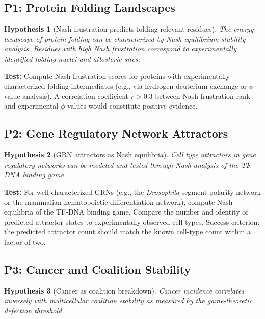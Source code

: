 \documentclass[12pt,a4paper]{article}
\newtheorem{hypothesis}{Hypothesis}
\theoremstyle{remark}
\begin{document}
\subsection{P1: Protein Folding Landscapes}

\begin{hypothesis}[Nash frustration predicts folding-relevant residues]
The energy landscape of protein folding can be characterized by Nash equilibrium stability analysis. Residues with high Nash frustration correspond to experimentally identified folding nuclei and allosteric sites.
\end{hypothesis}

\textbf{Test:} Compute Nash frustration scores for proteins with experimentally characterized folding intermediates (e.g., via hydrogen-deuterium exchange or $\phi$-value analysis). A correlation coefficient $r > 0.3$ between Nash frustration rank and experimental $\phi$-values would constitute positive evidence.

\subsection{P2: Gene Regulatory Network Attractors}

\begin{hypothesis}[GRN attractors as Nash equilibria]
Cell type attractors in gene regulatory networks can be modeled and tested through Nash analysis of the TF-DNA binding game.
\end{hypothesis}

\textbf{Test:} For well-characterized GRNs (e.g., the \textit{Drosophila} segment polarity network or the mammalian hematopoietic differentiation network), compute Nash equilibria of the TF-DNA binding game. Compare the number and identity of predicted attractor states to experimentally observed cell types. Success criterion: the predicted attractor count should match the known cell-type count within a factor of two.

\subsection{P3: Cancer and Coalition Stability}

\begin{hypothesis}[Cancer as coalition breakdown]
Cancer incidence correlates inversely with multicellular coalition stability as measured by the game-theoretic defection threshold.
\end{hypothesis}
\end{document}

